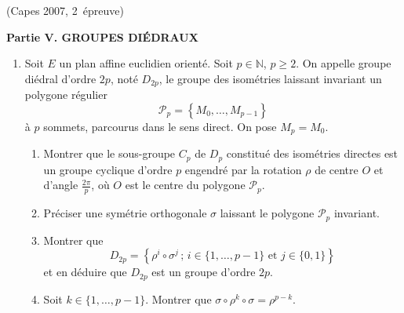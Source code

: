 \documentclass[a4paper,12pt,reqno]{amsart}
\begin{document}
\begin{exo} (Capes 2007, 2\ieme\ épreuve)

\begin{center}
  \textbf{Partie V. GROUPES DIÉDRAUX}
\end{center}

\begin{enumerate}
  \renewcommand{\theenumi}{\arabic{enumi}}
  \renewcommand{\labelenumi}{\bf\theenumi.}
  \renewcommand{\theenumii}{\alph{enumii}}
  \renewcommand{\labelenumii}{\theenumii)}

  \item Soit $E$ un plan affine euclidien orienté. Soit $p \in \mathbb{N}$, $p \geq 2$. On appelle groupe diédral d'ordre $2p$, noté $D_{2p}$, le groupe des isométries laissant invariant un polygone régulier
  \[
    \mathcal{P}_{p}=\left\{M_{0},\ldots,M_{p-1}\right\}
  \]
  à $p$ sommets, parcourus dans le sens direct. On pose $M_{p}=M_{0}$.
  \begin{enumerate}
    \item Montrer que le sous-groupe $C_{p}$ de $D_{p}$ constitué des isométries directes est un groupe cyclique d'ordre $p$ engendré par la rotation $\rho$ de centre $O$ et d'angle $\frac{2 \pi}{p}$, où $O$ est le centre du polygone $\mathcal{P}_{p}$.

    \item Préciser une symétrie orthogonale $\sigma$ laissant le polygone $\mathcal{P}_{p}$ invariant.

    \item Montrer que
    \[
      D_{2p} = \left\{
        \rho^{i}\circ \sigma^{j} \,;\, i \in \{1,\ldots,p-1\} \text{ et } j \in \{0,1\}
      \right\}
    \]
    et en déduire que $D_{2p}$ est un groupe d'ordre $2p$.

    \item Soit $k \in \{1,\ldots,p-1\}$. Montrer que $\sigma \circ \rho^{k} \circ \sigma = \rho^{p-k}$.
  \end{enumerate}
\end{enumerate}

\end{exo}
\end{document}
